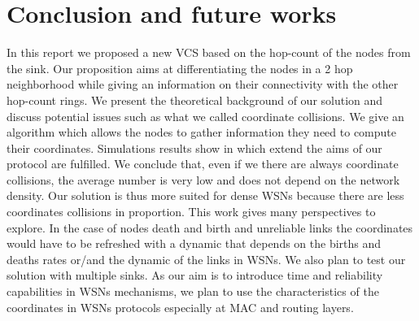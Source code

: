 \documentclass[a4paper]{article}
\begin{document}
\section{Conclusion and future works}
In this report we proposed a new VCS based on the hop-count of the nodes from the sink. Our proposition aims at differentiating the nodes in a 2 hop neighborhood while giving an information on their connectivity with the other hop-count rings. We present the theoretical background of our solution and discuss potential issues such as what we called coordinate collisions. We give an algorithm which allows the nodes to gather information they need to compute their coordinates. Simulations results show in which extend the aims of our protocol are fulfilled. We conclude that, even if we there are always coordinate collisions, the average number is very low and does not depend on the network density. Our solution is thus more suited for dense WSNs because there are less coordinates collisions in proportion. This work gives many perspectives to explore.
In the case of nodes death and birth and unreliable links the coordinates would have to be refreshed with a dynamic that depends on the births and deaths rates or/and the dynamic of the links in WSNs. We also plan to test our solution with multiple sinks. As our aim is to introduce time and reliability capabilities in WSNs mechanisms, we plan to use the characteristics of the coordinates in WSNs protocols especially at MAC and routing layers.




\newpage
\tableofcontents
\end{document}
